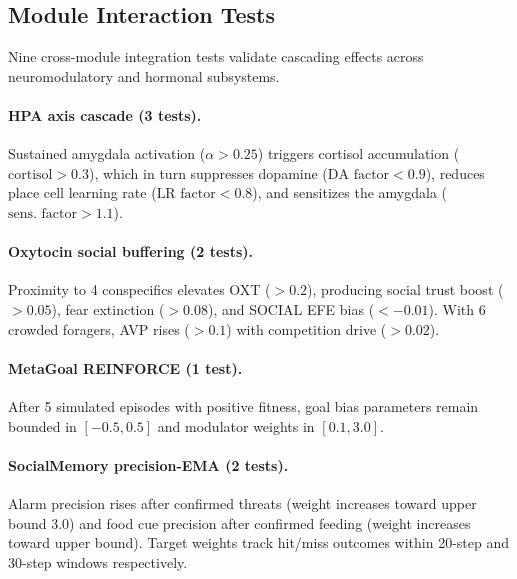 \documentclass[11pt,a4paper]{article}
\begin{document}
\subsection{Module Interaction Tests}\label{sec:module_interaction_tests}

Nine cross-module integration tests validate cascading effects across
neuromodulatory and hormonal subsystems.

\paragraph{HPA axis cascade (3 tests).}
Sustained amygdala activation ($\alpha > 0.25$) triggers cortisol
accumulation ($\text{cortisol} > 0.3$), which in turn suppresses
dopamine ($\text{DA factor} < 0.9$), reduces place cell learning rate
($\text{LR factor} < 0.8$), and sensitizes the amygdala
($\text{sens.\ factor} > 1.1$).

\paragraph{Oxytocin social buffering (2 tests).}
Proximity to 4 conspecifics elevates OXT ($> 0.2$), producing social
trust boost ($> 0.05$), fear extinction ($> 0.08$), and SOCIAL EFE
bias ($< -0.01$). With 6 crowded foragers, AVP rises ($> 0.1$)
with competition drive ($> 0.02$).

\paragraph{MetaGoal REINFORCE (1 test).}
After 5 simulated episodes with positive fitness, goal bias parameters
remain bounded in $[-0.5, 0.5]$ and modulator weights in $[0.1, 3.0]$.

\paragraph{SocialMemory precision-EMA (2 tests).}
Alarm precision rises after confirmed threats (weight increases toward
upper bound 3.0) and food cue precision after confirmed feeding
(weight increases toward upper bound). Target weights track
hit/miss outcomes within 20-step and 30-step windows respectively.
\end{document}
